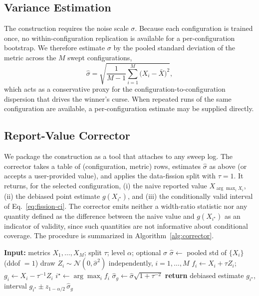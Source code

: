 \documentclass[conference]{IEEEtran}
\begin{document}
\subsection{Variance Estimation}
The construction requires the noise scale $\sigma$. Because each configuration is trained once, no within-configuration replication is available for a per-configuration bootstrap. We therefore estimate $\sigma$ by the pooled standard deviation of the metric across the $M$ swept configurations,
\begin{equation}
\hat\sigma = \sqrt{\frac{1}{M-1}\sum_{i=1}^{M}\bigl(X_i - \bar X\bigr)^2} ,
\end{equation}
which acts as a conservative proxy for the configuration-to-configuration dispersion that drives the winner's curse. When repeated runs of the same configuration are available, a per-configuration estimate may be supplied directly.

\subsection{Report-Value Corrector}
We package the construction as a tool that attaches to any sweep log. The corrector takes a table of (configuration, metric) rows, estimates $\hat\sigma$ as above (or accepts a user-provided value), and applies the data-fission split with $\tau = 1$. It returns, for the selected configuration, (i) the naive reported value $X_{\arg\max_i X_i}$, (ii) the debiased point estimate $g(X_{i^\star})$, and (iii) the conditionally valid interval of Eq.~\eqref{eq:fission-ci}. The corrector emits neither a width-ratio statistic nor any quantity defined as the difference between the naive value and $g(X_{i^\star})$ as an indicator of validity, since such quantities are not informative about conditional coverage. The procedure is summarized in Algorithm~\ref{alg:corrector}.

\begin{algorithm}[t]
\caption{Data-fission report-value corrector}
\label{alg:corrector}
\begin{algorithmic}[1]
\STATE \textbf{Input:} metrics $X_1,\dots,X_M$; split $\tau$; level $\alpha$; optional $\sigma$
  \STATE $\hat\sigma \leftarrow$ pooled std of $\{X_i\}$ (ddof $=1$)
\ENDIF
\STATE draw $Z_i \sim \mathcal{N}(0,\hat\sigma^2)$ independently, $i=1,\dots,M$
\STATE $f_i \leftarrow X_i + \tau Z_i$;\quad $g_i \leftarrow X_i - \tau^{-1} Z_i$
\STATE $i^\star \leftarrow \arg\max_i f_i$
\STATE $\hat\sigma_g \leftarrow \hat\sigma\sqrt{1 + \tau^{-2}}$
\STATE \textbf{return} debiased estimate $g_{i^\star}$, interval $g_{i^\star} \pm z_{1-\alpha/2}\,\hat\sigma_g$
\end{algorithmic}
\end{algorithm}
\end{document}
